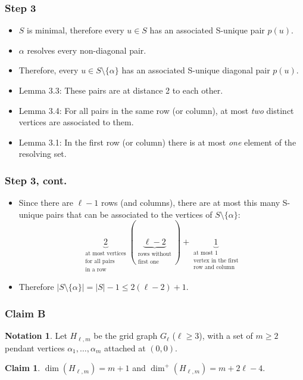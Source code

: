 \documentclass[hyperref={pdfpagelabels=false}]{beamer}
\theoremstyle{definition}
\newtheorem{ntn}{Notation}
\theoremstyle{theorem}
\newtheorem{clm}{Claim}
\begin{document}
\begin{frame}
	\frametitle{Step 3}
	\begin{itemize}
		\item $S$ is minimal, therefore every $u \in S$ has an associated S-unique pair $p(u)$.
		\item $\alpha$ resolves every non-diagonal pair.
		\item Therefore, every $u \in S \setminus \{\alpha\}$ has an associated S-unique diagonal pair $p(u)$.
		\item Lemma 3.3: These pairs are at distance 2 to each other.
		\item Lemma 3.4: For all pairs in the same row (or column), at most \emph{two} distinct vertices are associated to them.
		\item Lemma 3.1: In the first row (or column) there is at most \emph{one} element of the resolving set. %
	\end{itemize}
\end{frame}
\begin{frame}
	\frametitle{Step 3, cont.}
	\begin{itemize}
		\item Since there are $\ell - 1$ rows (and columns), there are at most this many S-unique pairs that can be associated to the vertices of $S \setminus \{\alpha\}$:
			\[\underbrace{2}_{\substack{\text{at most vertices}\\\text{for all pairs}\\\text{in a row}}}
			(\underbrace{\ell - 2}_{\substack{\text{rows without}\\\text{first one}}})
		+ \underbrace{1}_{\substack{\text{at most 1}\\\text{vertex in the first}\\\text{row and column}}}\]
		\item Therefore $|S \setminus \{\alpha\}| = |S| - 1 \leq 2(\ell - 2) + 1$.
	\end{itemize}
\end{frame}
\begin{frame}
	\frametitle{Claim B}
	\begin{ntn}
		Let $H_{\ell,m}$ be the grid graph $G_\ell$ ($\ell \geq 3$), with a set of $m \geq 2$ pendant vertices $\alpha_1, \dotsc, \alpha_m$ attached at $(0,0)$.
	\end{ntn}
	\begin{clm}
		$\dim(H_{\ell,m}) = m + 1$ and $\dim^+(H_{\ell,m}) = m + 2\ell - 4$.
	\end{clm}
\end{frame}
\end{document}
